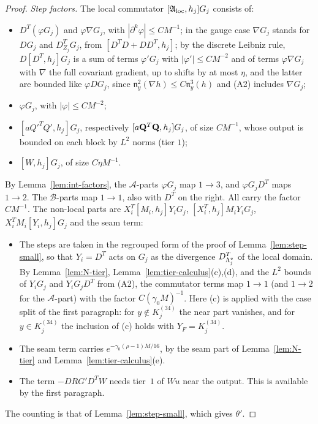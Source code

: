 \begin{proof}
\emph{Step factors.} The local commutator $[\mathfrak A_{\rm loc},h_j]G_j$ consists of:
\begin{itemize}
\item $D^T(\varphi G_j)$ and $\varphi\nabla G_j$, with $|\partial^k\varphi|\le CM^{-1}$; in the gauge case $\nabla G_j$ stands for $DG_j$ and $D^T_{Z_j}G_j$, from $[D^TD+DD^T,h_j]$; by the discrete Leibniz rule, $D[D^T,h_j]G_j$ is a sum of terms $\varphi'G_j$ with $|\varphi'|\le CM^{-2}$ and of terms $\varphi\nabla G_j$ with $\nabla$ the full covariant gradient, up to shifts by at most $\eta$, and the latter are bounded like $\varphi DG_j$, since $\mathfrak n^2_y(\nabla h)\le C\mathfrak n^3_y(h)$ and (A2) includes $\nabla G_j$;
\item $\varphi G_j$, with $|\varphi|\le CM^{-2}$;
\item $[aQ'^TQ',h_j]G_j$, respectively $[a\mathbf Q^T\mathbf Q,h_j]G_j$, of size $CM^{-1}$, whose output is bounded on each block by $L^2$ norms (tier $1$);
\item $[W,h_j]G_j$, of size $C\eta M^{-1}$.
\end{itemize}
By Lemma~\ref{lem:int-factors}, the $\mathcal A$-parts $\varphi G_j$ map $1\to3$, and $\varphi G_jD^T$ maps $1\to2$. The $\mathcal B$-parts map $1\to1$, also with $D^T$ on the right. All carry the factor $CM^{-1}$. The non-local parts are $X_i^T[M_i,h_j]Y_iG_j$, $[X_i^T,h_j]M_iY_iG_j$, $X_i^TM_i[Y_i,h_j]G_j$ and the seam term:
\begin{itemize}
\item The steps are taken in the regrouped form of the proof of Lemma~\ref{lem:step-small}, so that $Y_i=D^T$ acts on $G_j$ as the divergence $D^T_{\Lambda^v_j}$ of the local domain. By Lemma~\ref{lem:N-tier}, Lemma~\ref{lem:tier-calculus}(c),(d), and the $L^2$ bounds of $Y_iG_j$ and $Y_iG_jD^T$ from (A2), the commutator terms map $1\to1$ (and $1\to2$ for the $\mathcal A$-part) with the factor $C(\gamma_0M)^{-1}$. Here (c) is applied with the case split of the first paragraph: for $y\notin K_j^{(34)}$ the near part vanishes, and for $y\in K_j^{(34)}$ the inclusion of (c) holds with $Y_F=K_j^{(34)}$.
\item The seam term carries $e^{-\gamma_0(\rho-1)M/16}$, by the seam part of Lemma~\ref{lem:N-tier} and Lemma~\ref{lem:tier-calculus}(e).
\item The term $-DRG'D^TW$ needs tier~$1$ of $Wu$ near the output. This is available by the first paragraph.
\end{itemize}
The counting is that of Lemma~\ref{lem:step-small}, which gives $\theta'$.


\end{proof}
